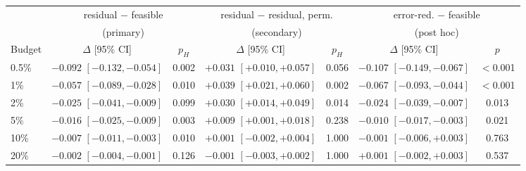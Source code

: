 \begin{tabular}{lcccccc}
\toprule
 & \multicolumn{2}{c}{residual $-$ feasible} & \multicolumn{2}{c}{residual $-$ residual, perm.} & \multicolumn{2}{c}{error-red. $-$ feasible} \\
 & \multicolumn{2}{c}{(primary)} & \multicolumn{2}{c}{(secondary)} & \multicolumn{2}{c}{(post hoc)} \\
\cmidrule(lr){2-3}\cmidrule(lr){4-5}\cmidrule(lr){6-7}
Budget & $\Delta$ [95\% CI] & $p_H$ & $\Delta$ [95\% CI] & $p_H$ & $\Delta$ [95\% CI] & $p$ \\
\midrule
0.5\% & $-0.092$ $[-0.132, -0.054]$ & 0.002 & ${+}0.031$ $[{+}0.010, {+}0.057]$ & 0.056 & $-0.107$ $[-0.149, -0.067]$ & $<$0.001 \\
1\% & $-0.057$ $[-0.089, -0.028]$ & 0.010 & ${+}0.039$ $[{+}0.021, {+}0.060]$ & 0.002 & $-0.067$ $[-0.093, -0.044]$ & $<$0.001 \\
2\% & $-0.025$ $[-0.041, -0.009]$ & 0.099 & ${+}0.030$ $[{+}0.014, {+}0.049]$ & 0.014 & $-0.024$ $[-0.039, -0.007]$ & 0.013 \\
5\% & $-0.016$ $[-0.025, -0.009]$ & 0.003 & ${+}0.009$ $[{+}0.001, {+}0.018]$ & 0.238 & $-0.010$ $[-0.017, -0.003]$ & 0.021 \\
10\% & $-0.007$ $[-0.011, -0.003]$ & 0.010 & ${+}0.001$ $[-0.002, {+}0.004]$ & 1.000 & $-0.001$ $[-0.006, {+}0.003]$ & 0.763 \\
20\% & $-0.002$ $[-0.004, -0.001]$ & 0.126 & $-0.001$ $[-0.003, {+}0.002]$ & 1.000 & ${+}0.001$ $[-0.002, {+}0.003]$ & 0.537 \\
\bottomrule
\end{tabular}